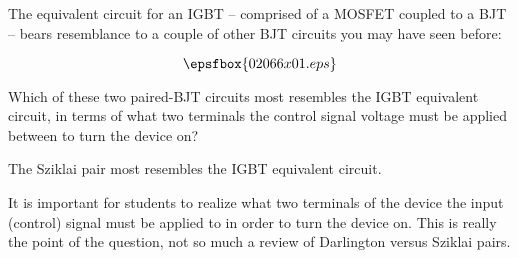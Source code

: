 

The equivalent circuit for an IGBT -- comprised of a MOSFET coupled to a BJT -- bears resemblance to a couple of other BJT circuits you may have seen before:

$$\epsfbox{02066x01.eps}$$

Which of these two paired-BJT circuits most resembles the IGBT equivalent circuit, in terms of what two terminals the control signal voltage must be applied between to turn the device on?







The Sziklai pair most resembles the IGBT equivalent circuit.







It is important for students to realize what two terminals of the device the input (control) signal must be applied to in order to turn the device on.  This is really the point of the question, not so much a review of Darlington versus Sziklai pairs.




